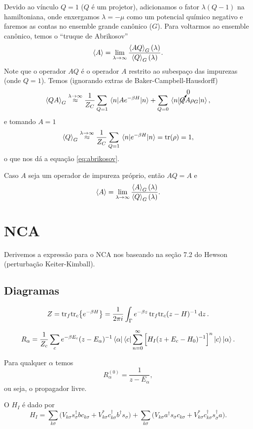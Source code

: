 \documentclass[a4paper,fleqn,12pt]{article}
\renewcommand{\tr}{\text{tr}}
\renewcommand{\s}{\sigma}
\newcommand{\us}{{\overline{\sigma}}}
\renewcommand{\d}{\dagger}
\begin{document}
Devido ao vínculo $Q = 1$ ($Q$ é um projetor), adicionamos o fator $\lambda (Q - 1)$ na hamiltoniana, onde enxergamos $\lambda = -\mu$ como um potencial químico negativo e faremos as contas no ensemble grande canônico ($G$). Para voltarmos ao ensemble canônico, temos o ``truque de Abrikosov''
\begin{equation} \label{eq:abrikosov}
\ev{A} = \lim_{\lambda \to \infty} \frac{\ev{AQ}_G(\lambda)}{\ev{Q}_G(\lambda)}.
\end{equation}
Note que o operador $AQ$ é o operador $A$ restrito ao subespaço das impurezas (onde $Q = 1$). Temos (ignorando extras de Baker-Campbell-Hausdorff)
$$
\ev{QA}_G \stackrel{\lambda \to \infty}{\approx}
\frac{1}{Z_C} \sum_{Q = 1} \mel{n}{Ae^{-\beta H}}{n} +
\sum_{Q = 0} \mel{n}{\cancelto{0}{Q}A\rho_G}{n},
$$
e tomando $A = 1$
$$
\ev{Q}_G \stackrel{\lambda \to \infty}{\approx}
\frac{1}{Z_C} \sum_{Q = 1} \mel{n}{e^{-\beta H}}{n} = \tr(\rho) = 1,
$$
o que nos dá a equação \ref{eq:abrikosov}.

Caso $A$ seja um operador de impureza próprio, então $AQ = A$ e
\begin{equation} \label{eq:abrikosov-imp}
\ev{A} = \lim_{\lambda \to \infty} \frac{\ev{A}_G(\lambda)}{\ev{Q}_G(\lambda)}.
\end{equation}


\section{NCA}

Derivemos a expressão para o NCA nos baseando na seção 7.2 do Hewson (perturbação Keiter-Kimball).


\subsection{Diagramas}

$$
Z = \tr_{f} \tr_{c}\qty{e^{-\beta H}} =
\frac{1}{2\pi i}\int_\Gamma e^{-\beta z} \, \tr_{f} \tr_{c} (z-H)^{-1} \dd{z}.
$$

$$
R_\alpha = \frac{1}{Z_c} \sum_c e^{-\beta E_c} (z-E_\alpha)^{-1} \bra{\alpha}\bra{c}
\sum_{n=0}^\infty \Big[ H_I (z+E_c - H_0)^{-1} \Big]^n \ket{c} \ket{\alpha}.
$$

Para qualquer $\alpha$ temos
$$
R_\alpha^{(0)} = \frac{1}{z - E_\alpha},
$$
ou seja, o propagador livre.

O $H_I$ é dado por
$$
H_I = \sum_{k \s}
\Big(
V_{k\s} s_{\s}^\d b c_{k\s} +
V_{k\s}^* c_{k\s}^\d b^\d s_{\s}
\Big) +
\sum_{k \s}
\Big(
V_{k\s} a^\d s_{\us} c_{k\s} +
V_{k\s}^* c_{k\s}^\d s_{\us}^\d a
\Big).
$$
\end{document}
